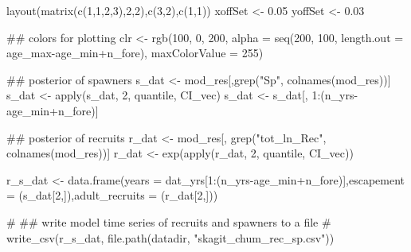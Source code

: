 \documentclass[11pt,]{article}
\newenvironment{Shaded}{}{}
\newcommand{\KeywordTok}[1]{\textcolor[rgb]{0.00,0.00,1.00}{#1}}
\newcommand{\DataTypeTok}[1]{#1}
\newcommand{\DecValTok}[1]{#1}
\newcommand{\FloatTok}[1]{#1}
\newcommand{\StringTok}[1]{\textcolor[rgb]{0.00,0.50,0.50}{#1}}
\newcommand{\CommentTok}[1]{\textcolor[rgb]{0.00,0.50,0.00}{#1}}
\newcommand{\OperatorTok}[1]{#1}
\newcommand{\NormalTok}[1]{#1}
\begin{document}
\begin{Shaded}
\begin{Highlighting}[]
\KeywordTok{layout}\NormalTok{(}\KeywordTok{matrix}\NormalTok{(}\KeywordTok{c}\NormalTok{(}\DecValTok{1}\NormalTok{,}\DecValTok{1}\NormalTok{,}\DecValTok{2}\NormalTok{,}\DecValTok{3}\NormalTok{),}\DecValTok{2}\NormalTok{,}\DecValTok{2}\NormalTok{),}\KeywordTok{c}\NormalTok{(}\DecValTok{3}\NormalTok{,}\DecValTok{2}\NormalTok{),}\KeywordTok{c}\NormalTok{(}\DecValTok{1}\NormalTok{,}\DecValTok{1}\NormalTok{))}
\NormalTok{xoffSet <-}\StringTok{ }\FloatTok{0.05}
\NormalTok{yoffSet <-}\StringTok{ }\FloatTok{0.03}

\NormalTok{## colors for plotting}
\NormalTok{clr <-}\StringTok{ }\KeywordTok{rgb}\NormalTok{(}\DecValTok{100}\NormalTok{, }\DecValTok{0}\NormalTok{, }\DecValTok{200}\NormalTok{,}
           \DataTypeTok{alpha =} \KeywordTok{seq}\NormalTok{(}\DecValTok{200}\NormalTok{, }\DecValTok{100}\NormalTok{,}
                       \DataTypeTok{length.out =}\NormalTok{ age_max}\OperatorTok{-}\NormalTok{age_min}\OperatorTok{+}\NormalTok{n_fore),}
           \DataTypeTok{maxColorValue =} \DecValTok{255}\NormalTok{)}

\NormalTok{## posterior of spawners}
\NormalTok{s_dat <-}\StringTok{ }\NormalTok{mod_res[,}\KeywordTok{grep}\NormalTok{(}\StringTok{"Sp"}\NormalTok{, }\KeywordTok{colnames}\NormalTok{(mod_res))]}
\NormalTok{s_dat <-}\StringTok{ }\KeywordTok{apply}\NormalTok{(s_dat, }\DecValTok{2}\NormalTok{, quantile, CI_vec)}
\NormalTok{s_dat <-}\StringTok{ }\NormalTok{s_dat[, }\DecValTok{1}\OperatorTok{:}\NormalTok{(n_yrs}\OperatorTok{-}\NormalTok{age_min}\OperatorTok{+}\NormalTok{n_fore)]}

\NormalTok{## posterior of recruits}
\NormalTok{r_dat <-}\StringTok{ }\NormalTok{mod_res[, }\KeywordTok{grep}\NormalTok{(}\StringTok{"tot_ln_Rec"}\NormalTok{, }\KeywordTok{colnames}\NormalTok{(mod_res))]}
\NormalTok{r_dat <-}\StringTok{ }\KeywordTok{exp}\NormalTok{(}\KeywordTok{apply}\NormalTok{(r_dat, }\DecValTok{2}\NormalTok{, quantile, CI_vec))}

\NormalTok{r_s_dat <-}\StringTok{ }\KeywordTok{data.frame}\NormalTok{(}\DataTypeTok{years =}\NormalTok{ dat_yrs[}\DecValTok{1}\OperatorTok{:}\NormalTok{(n_yrs}\OperatorTok{-}\NormalTok{age_min}\OperatorTok{+}\NormalTok{n_fore)],}\DataTypeTok{escapement =}\NormalTok{ (s_dat[}\DecValTok{2}\NormalTok{,]),}\DataTypeTok{adult_recruits =}\NormalTok{ (r_dat[}\DecValTok{2}\NormalTok{,]))}

\CommentTok{# ## write model time series of recruits and spawners to a file}
\CommentTok{# write_csv(r_s_dat, file.path(datadir, "skagit_chum_rec_sp.csv"))}



\end{Highlighting}
\end{Shaded}
\end{document}
